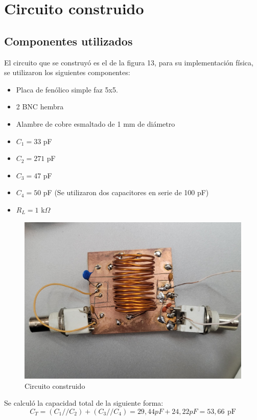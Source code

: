 \section{Circuito construido}
\subsection{Componentes utilizados}
El circuito que se construyó es el de la figura 13, para su implementación física, se utilizaron los siguientes componentes:
\begin{itemize}
    \item Placa de fenólico simple faz 5x5.
    \item 2 BNC hembra
    \item Alambre de cobre esmaltado de 1 mm de diámetro
    \item \(C_1 = 33\) pF
    \item \(C_2 = 271\) pF
    \item \(C_3 = 47\) pF
    \item \(C_4 = 50\) pF (Se utilizaron dos capacitores en serie de 100 pF)
    \item \(R_L = 1\) k\(\Omega\)
\end{itemize}
\begin{figure}[!h]
    \centering
    \includegraphics[scale=0.1]{Imagenes/Circuito montado.jpg}
    \caption{Circuito construido}
    \label{fig:Circteo__}
\end{figure}
Se calculó la capacidad total de la siguiente forma:
\begin{equation}
    C_T = (C_1//C_2)+(C_3//C_4) = 29,44pF + 24,22pF = 53,66 \,\ \text{pF}
\end{equation}

